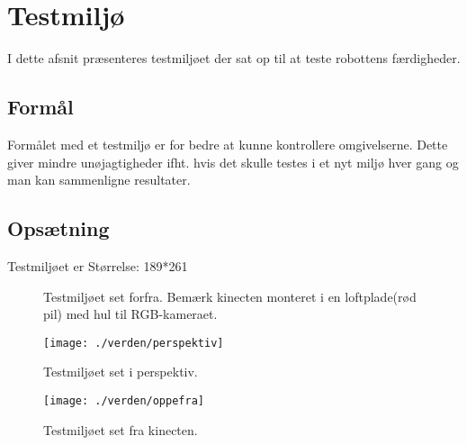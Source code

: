 \section{Testmiljø}
I dette afsnit præsenteres testmiljøet der sat op til at teste robottens færdigheder.

\subsection{Formål}
Formålet med et testmiljø er for bedre at kunne kontrollere omgivelserne.
Dette giver mindre unøjagtigheder ifht. hvis det skulle testes i et nyt miljø hver gang og man kan sammenligne resultater.

\subsection{Opsætning}
Testmiljøet er
Størrelse: 189*261

\begin{figure}
\caption{Testmiljøet set forfra. Bemærk kinecten monteret i en loftplade(rød pil) med hul til RGB-kameraet.}
\label{testmiljo:forfra}
\end{figure}

\begin{figure}
\texttt{[image: ./verden/perspektiv]}
\label{testmiljo:perspektiv}
\caption{Testmiljøet set i perspektiv.}
\end{figure}
\begin{figure}
\texttt{[image: ./verden/oppefra]}
\caption{Testmiljøet set fra kinecten.}
\label{testmiljo:oppefra}
\end{figure}